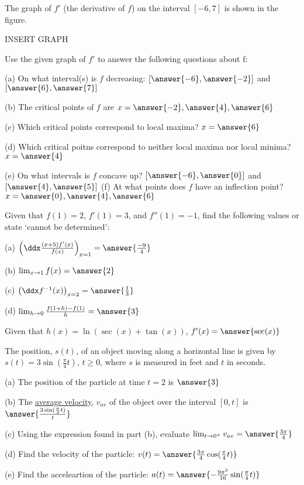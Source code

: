 \documentclass{ximera}
\begin{document}
\begin{exercise}
The graph of $f'$ (the derivative of $f$) on the interval $[-6,7]$ is shown in the figure.

INSERT GRAPH

Use the given graph of $f'$ to answer the following questions about f:

(a) On what interval(s) is $f$ decreasing: $[\answer{-6},\answer{-2}]$ and $[\answer{6},\answer{7}]$

(b) The critical points of $f$ are $x=\answer{-2},\answer{4},\answer{6}$

(c) Which critical points correspond to local maxima? $x=\answer{6}$

(d) Which critical poitns correspond to neither local maxima nor local minima? $x=\answer{4}$

(e) On what intervals is $f$ concave up? $[\answer{-6},\answer{0}]$ and $[\answer{4},\answer{5}]$
(f) At what points does $f$ have an inflection point? $x=\answer{0},\answer{4},\answer{6}$
\end{exercise}

\begin{exercise}
Given that $f(1)=2$, $f'(1)=3$, and $f''(1)=-1$, find the following values or state `cannot be determined':

(a) $\left(\ddx\frac{(x+5)f'(x)}{f(x)}\right)_{x=1}=\answer{\frac{-9}{4}}$

(b) $\lim_{x\to 1}f(x)=\answer{2}$

(c) $\left(\ddx f^{-1}(x)\right)_{x=2}=\answer{\frac{1}{3}}$

(d) $\lim_{h\to 0}\frac{f(1+h)-f(1)}{h}=\answer{3}$

\end{exercise}

\begin{exercise}
Given that $h(x)=\ln(\sec(x)+\tan(x))$, $f'(x) = \answer{\sec(x)}$
\end{exercise}


\begin{exercise}
The position, $s(t)$, of an object moving along a horizontal line is given by $s(t)=3\sin\left(\frac{\pi}{4}t\right)$, $t\geq0$, where $s$ is measured in feet and $t$ in seconds.

(a) The position of the particle at time $t=2$ is $\answer{3}$

(b) The \underline{average velocity}, $v_{av}$ of the object over the interval $[0,t]$ is $\answer{\frac{3\sin(\frac{\pi}{4}t)}{t}}$

(c) Using the expression found in part (b), evaluate $\lim_{t\to0^+} v_{av} = \answer{\frac{3\pi}{4}}$

(d) Find the velocity of the particle: $v(t)=\answer{\frac{3\pi}{4}\cos(\frac{\pi}{4}t)}$

(e) Find the acceleartion of the particle: $a(t)=\answer{-\frac{9\pi^2}{16}\sin(\frac{\pi}{4}t)}$

\end{exercise}
\end{document}
